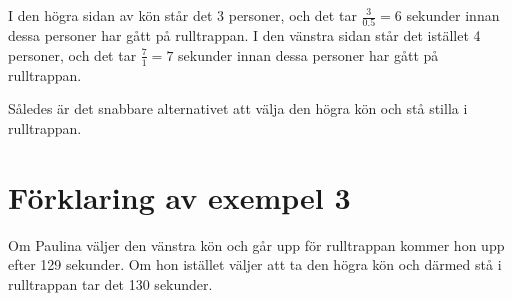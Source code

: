 I den högra sidan av kön står det 3 personer, och det tar $\frac{3}{0.5} = 6$ sekunder innan dessa personer har gått på rulltrappan.
I den vänstra sidan står det istället 4 personer, och det tar $\frac{7}{1} = 7$ sekunder innan dessa personer har gått på rulltrappan.

Således är det snabbare alternativet att välja den högra kön och stå stilla i rulltrappan.

\section*{Förklaring av exempel 3}
Om Paulina väljer den vänstra kön och går upp för rulltrappan kommer hon upp efter 129 sekunder. 
Om hon istället väljer att ta den högra kön och därmed stå i rulltrappan tar det 130 sekunder.
